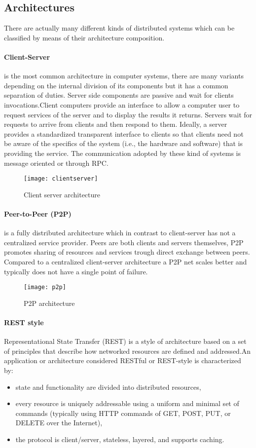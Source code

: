 \subsection{Architectures}
\par
There are actually many different kinds of distributed systems which can be classified by means of their architecture composition.
\paragraph{Client-Server} is the most common architecture in computer systems, there are many variants depending on the internal division of its components but it has a common separation of duties. Server side components are passive and wait for clients invocations.Client computers provide an interface to allow a computer user to request services of the server and to display the results it returns. Servers wait for requests to arrive from clients and then respond to them. Ideally, a server provides a standardized transparent interface to clients so that clients need not be aware of the specifics of the system (i.e., the hardware and software) that is providing the service. The communication adopted by these kind of systems is message oriented or through RPC.
\begin{figure}[h]
	\centering
	\texttt{[image: clientserver]}
	\caption{Client server architecture}
	\label{fig:2.12}
\end{figure} 
\paragraph{Peer-to-Peer (P2P)} is a fully distributed architecture which in contrast to client-server has not a centralized service provider. Peers are both clients and servers themselves, P2P promotes sharing of resources and services trough direct exchange between peers. Compared to a centralized client-server architecture a P2P net scales better and typically does not have a single point of failure. 
\begin{figure}[h]
	\centering
	\texttt{[image: p2p]}
	\caption{P2P architecture}
	\label{fig:2.13}
\end{figure} 
\paragraph{REST style} Representational State Transfer (REST) is a style of architecture based on a set of principles that describe how networked resources are defined and addressed.An application or architecture considered RESTful or REST-style is characterized by:
\begin{itemize}
	\item state and functionality are divided into distributed resources,
	\item every resource is uniquely addressable using a uniform and minimal set of commands (typically using HTTP commands of GET, POST, PUT, or DELETE over the Internet),
	\item the protocol is client/server, stateless, layered, and supports caching.
\end{itemize}



